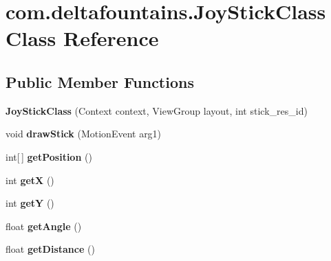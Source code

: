\hypertarget{classcom_1_1deltafountains_1_1JoyStickClass}{\section{com.\-deltafountains.\-Joy\-Stick\-Class Class Reference}
\label{classcom_1_1deltafountains_1_1JoyStickClass}
}
\subsection*{Public Member Functions}
\begin{DoxyCompactItemize}
\item 
\hypertarget{classcom_1_1deltafountains_1_1JoyStickClass_abba638ed88b4dd43c9132af7baeec361}{{\bfseries Joy\-Stick\-Class} (Context context, View\-Group layout, int stick\-\_\-res\-\_\-id)}\label{classcom_1_1deltafountains_1_1JoyStickClass_abba638ed88b4dd43c9132af7baeec361}

\item 
\hypertarget{classcom_1_1deltafountains_1_1JoyStickClass_a09027d634492c7baae36d50c5ce7464a}{void {\bfseries draw\-Stick} (Motion\-Event arg1)}\label{classcom_1_1deltafountains_1_1JoyStickClass_a09027d634492c7baae36d50c5ce7464a}

\item 
\hypertarget{classcom_1_1deltafountains_1_1JoyStickClass_adc92209cddd918b2b3ab601d0ed51c9f}{int\mbox{[}$\,$\mbox{]} {\bfseries get\-Position} ()}\label{classcom_1_1deltafountains_1_1JoyStickClass_adc92209cddd918b2b3ab601d0ed51c9f}

\item 
\hypertarget{classcom_1_1deltafountains_1_1JoyStickClass_a7ac1c79facfa6fd4d9b4eb1eafba47a9}{int {\bfseries get\-X} ()}\label{classcom_1_1deltafountains_1_1JoyStickClass_a7ac1c79facfa6fd4d9b4eb1eafba47a9}

\item 
\hypertarget{classcom_1_1deltafountains_1_1JoyStickClass_aeee0012998434297d88cdc23b4461953}{int {\bfseries get\-Y} ()}\label{classcom_1_1deltafountains_1_1JoyStickClass_aeee0012998434297d88cdc23b4461953}

\item 
\hypertarget{classcom_1_1deltafountains_1_1JoyStickClass_a76f2418adec095443d59ba8f88a43f29}{float {\bfseries get\-Angle} ()}\label{classcom_1_1deltafountains_1_1JoyStickClass_a76f2418adec095443d59ba8f88a43f29}

\item 
\hypertarget{classcom_1_1deltafountains_1_1JoyStickClass_a453d64dfea113ef628867be3a89f37fe}{float {\bfseries get\-Distance} ()}\label{classcom_1_1deltafountains_1_1JoyStickClass_a453d64dfea113ef628867be3a89f37fe}


\end{DoxyCompactItemize}
